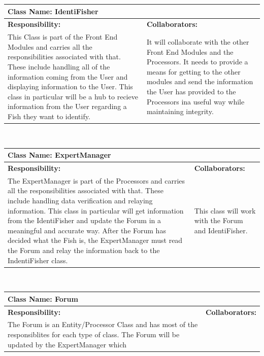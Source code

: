 \documentclass[]{article}
\begin{document}
	\begin{table}[ht]
		\centering
		\begin{tabular}{|p{5cm}|p{5cm}|}
		\hline
		 \multicolumn{2}{|l|}{\textbf{Class Name: IdentiFisher}} \\
		\hline
		\textbf{Responsibility:} & \textbf{Collaborators:} \\ \hline
		This Class is part of the Front End Modules and carries all the responsibilities associated with that. These include handling all of the information coming from the User and displaying information to the User. This class in particular will be a hub to recieve information from the User regarding a Fish they want to identify. & It will collaborate with the other Front End Modules and the Processors. It needs to provide a means for getting to the other modules and send the information the User has provided to the Processors ina useful way while maintaining integrity. \\
		\hline
		\end{tabular}
	\end{table}~\\

	\begin{table}[ht]
		\centering
		\begin{tabular}{|p{5cm}|p{5cm}|}
		\hline
		 \multicolumn{2}{|l|}{\textbf{Class Name: ExpertManager}} \\
		\hline
		\textbf{Responsibility:} & \textbf{Collaborators:} \\ \hline
		The ExpertManager is part of the Processors and carries all the responsibilities associated with that. These include handling data verification and relaying information. This class in particular will get information from the IdentiFisher and update the Forum in a meaningful and accurate way. After the Forum has decided what the Fish is, the ExpertManager must read the Forum and relay the information back to the IndentiFisher class. & This class will work with the Forum and IdentiFisher.\\
		\hline
		\end{tabular}
	\end{table}~\\

	\begin{table}[ht]
		\centering
		\begin{tabular}{|p{5cm}|p{5cm}|}
		\hline
		 \multicolumn{2}{|l|}{\textbf{Class Name: Forum}} \\
		\hline
		\textbf{Responsibility:} & \textbf{Collaborators:} \\ \hline
		The Forum is an Entity/Processor Class and has most of the responsiblites for each type of class. The Forum will be updated by the ExpertManager which & \\
		\hline
		\end{tabular}
	\end{table}~\\
	\pagebreak
\end{document}
